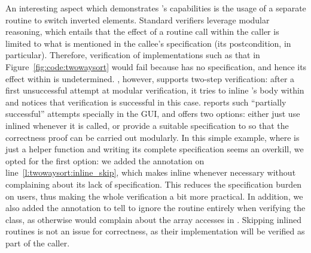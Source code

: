 An interesting aspect which demonstrates \AutoProof's capabilities is the usage of a separate routine  to switch inverted elements.
Standard verifiers leverage modular reasoning, which entails that the effect of a routine call within the caller is limited to what is mentioned in the callee's specification (its postcondition, in particular).
Therefore, verification of implementations such as that in Figure~\ref{fig:code:twowaysort} would fail because  has no specification, and hence its effect within  is undetermined.
\AutoProof, however, supports two-step verification: after a first unsuccessful attempt at modular verification, it tries to inline 's body within  and notices that verification is successful in this case.
\AutoProof reports such ``partially successful'' attempts specially in the GUI, and offers two options: either just use  inlined whenever it is called, or provide a suitable specification to  so that the correctness proof can be carried out modularly.
In this simple example, where  is just a helper function and writing its complete specification seems an overkill, we opted for the first option: we added the annotation  on line~\ref{l:twowaysort:inline_skip}, which makes \AutoProof inline  whenever necessary without complaining about its lack of specification.
This reduces the specification burden on users, thus making the whole verification a bit more practical.
In addition, we also added the annotation  to tell \AutoProof to ignore the  routine entirely when verifying the class, as otherwise \AutoProof would complain about the array accesses in . Skipping inlined routines is not an issue for correctness, as their implementation will be verified as part of the caller.




